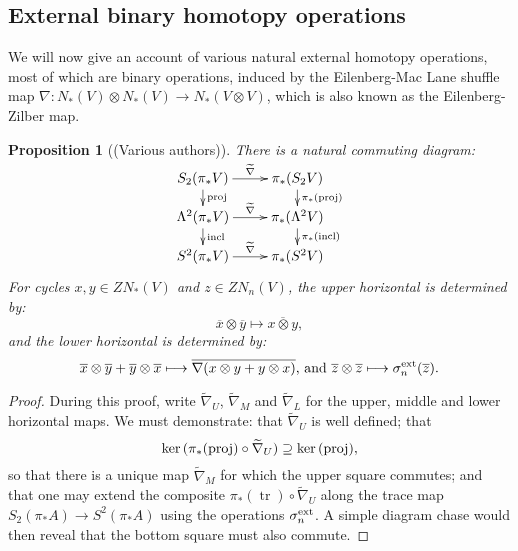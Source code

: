\documentclass[11pt]{amsart} \renewcommand{\baselinestretch}{1.4}
\theoremstyle{plain}
\newtheorem{prop}[thm]{Proposition}
\theoremstyle{definition}
\renewcommand{\ker}{\mathrm{ker}\,}
\DeclareMathOperator{\trace}{tr}
\renewcommand{\to}{\longrightarrow}
\newcommand{\calV}{\mathcal{V}}
\newcommand{\vect}[2]{\calV^{#1}_{#2}}
\renewcommand{\mapsto}{\longmapsto}
\begin{document}
\begin{Constructing homotopy operations}
\subsection{External binary homotopy operations}\label{External binary homotopy operations}
We will now give an account of various natural external homotopy operations, most of which are binary operations, induced by the  Eilenberg-Mac Lane shuffle map $\nabla:N_*(V)\otimes N_*(V)\to N_*(V\otimes V)$, which is also known as the Eilenberg-Zilber map.
\begin{prop}[(Various authors)]
\label{the top external homotopy operations}
There is a natural commuting diagram:
\[\xymatrix@R=4mm{
S_2(\pi_*V)\ar[r]^-{\smash{\widetilde{\nabla}}}
\ar[d]^-{\textup{proj}}
&%
\pi_*(S_2V)\ar[d]^-{\pi_*(\textup{proj})}
\\%
\Lambda^2(\pi_*V)\ar[r]^-{\widetilde{\nabla}}
\ar[d]^-{\textup{incl}}
&%
\pi_*(\Lambda^2V)\ar[d]^-{\pi_*(\textup{incl})}
\\%
S^2(\pi_*V)\ar[r]^-{\widetilde{\nabla}}&%
\pi_*(S^2V)%
}\]
For cycles $x,y\in ZN_*(V)$ and $z\in ZN_n(V)$, the upper horizontal is determined by:
\[\overline{x}\otimes\overline{y}\mapsto \overline{x\otimes y},\]
and the lower horizontal is determined by:
\[\overline{x}\otimes\overline{y}+\overline{y}\otimes \overline{x}\mapsto\overline{\nabla(x\otimes y+y\otimes x)}\textup{, and }\overline{z}\otimes\overline{z}\mapsto\sigma^\textup{ext}_n(\overline{z}).\]
\end{prop}
\begin{proof}
During this proof, write $\widetilde{\nabla}_U$, $\widetilde{\nabla}_M$ and $\widetilde{\nabla}_L$ for the upper, middle and lower horizontal maps. We must demonstrate: that $\widetilde{\nabla}_U$  is well defined; that
\[\ker(\pi_*(\textup{proj})\circ\widetilde{\nabla}_U)\supseteq\ker(\textup{proj}),\]
so that there is a unique map $\widetilde{\nabla}_M$ for which the upper square commutes; and that one may extend the composite $\pi_*(\trace)\circ\widetilde{\nabla}_U$ along the trace map $S_2(\pi_*A)\to S^2(\pi_*A)$ using the operations
$\sigma_n^\textup{ext}$.
A simple diagram chase would then reveal that the bottom square must also commute.


\end{proof}
\end{Constructing homotopy operations}
\end{document}
